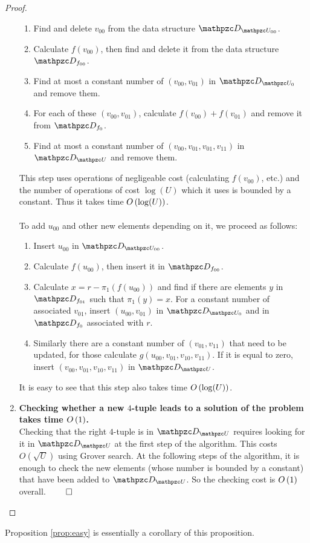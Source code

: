 \begin{proof}
\begin{enumerate}
\begin{enumerate}
\item Find and delete $v_{00}$ from the data structure $\zD_{\zU_{00}}$.
\item Calculate $f(v_{00})$, then find and delete it from the data structure $\zD_{f_{00}}$.
\item Find at most a constant number of $(v_{00}, v_{01})$ in $\zD_{\zU_{0}}$ and remove them.
\item For each of these $(v_{00}, v_{01})$, calculate $f(v_{00}) + f(v_{01})$ and remove it from $\zD_{f_{0}}$.
\item Find at most a constant number of $(v_{00}, v_{01}, v_{01}, v_{11})$ in $\zD_{\zU}$ and remove them.
\end{enumerate}
This step uses operations of negligeable cost (calculating $f(v_{00})$, etc.) and the number of operations of cost 
$\log(U)$ 
which it uses is bounded by a constant. Thus it takes time 
$O\left( \log(U) \right)$.\\ \\
To add $u_{00}$ and other new elements depending on it, we proceed as follows:
\begin{enumerate}
\item Insert $u_{00}$ in $\zD_{\zU_{00}}$.
\item Calculate $f(u_{00})$, then insert it in $\zD_{f_{00}}$.
\item Calculate $x=r - \pi_1(f(u_{00}))$ and find if there are elements $y$ in $\zD_{f_{01}}$ such that $\pi_1(y)=x$. For a constant number of associated $v_{01}$, insert $(u_{00}, v_{01})$ in $\zD_{\zU_{0}}$ and in $\zD_{f_{0}}$ associated with $r$.
\item Similarly there are a constant number of $(v_{01}, v_{11})$ that need to be updated, for those calculate $g(u_{00}, v_{01}, v_{10}, v_{11})$. If it is equal to zero, insert $(v_{00}, v_{01}, v_{10}, v_{11})$ in $\zD_{\zU}$.
\end{enumerate}
It is easy to see that this step also takes time 
$O\left( \log(U) \right)$.
\item \textbf{Checking whether a new $4$-tuple leads to a solution of the problem takes time $O\left( 1 \right)$.\\}
Checking that the right $4$-tuple is in $\zD_{\zU}$ requires looking for it in $\zD_{\zU}$ at the first step of the algorithm. This costs $O(\sqrt{U})$ using Grover search. At the following steps of the algorithm, it is enough to check the new elements (whose number is bounded by a constant) that have been added to $\zD_{\zU}$. So the checking cost is 
$O\left( 1 \right)$
 overall.$~\qed$
\end{enumerate}
\end{proof}
Proposition \ref{prop:easy} is essentially a corollary of this proposition. 

